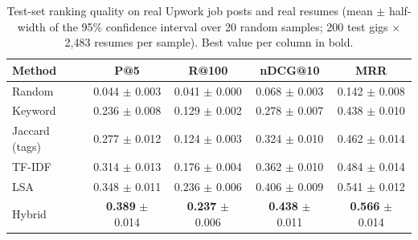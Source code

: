 \begin{table}[htbp]
\centering
\small
\caption{Test-set ranking quality on real Upwork job posts and real resumes (mean $\pm$ half-width of the 95\% confidence interval over 20 random samples; 200 test gigs $\times$ 2,483 resumes per sample). Best value per column in bold.}
\label{tab:main}
\begin{tabular}{lcccc}
\toprule
Method & P@5 & R@100 & nDCG@10 & MRR \\
\midrule
Random & 0.044 $\pm$ 0.003 & 0.041 $\pm$ 0.000 & 0.068 $\pm$ 0.003 & 0.142 $\pm$ 0.008 \\
Keyword & 0.236 $\pm$ 0.008 & 0.129 $\pm$ 0.002 & 0.278 $\pm$ 0.007 & 0.438 $\pm$ 0.010 \\
Jaccard (tags) & 0.277 $\pm$ 0.012 & 0.124 $\pm$ 0.003 & 0.324 $\pm$ 0.010 & 0.462 $\pm$ 0.014 \\
TF-IDF & 0.314 $\pm$ 0.013 & 0.176 $\pm$ 0.004 & 0.362 $\pm$ 0.010 & 0.484 $\pm$ 0.014 \\
LSA & 0.348 $\pm$ 0.011 & 0.236 $\pm$ 0.006 & 0.406 $\pm$ 0.009 & 0.541 $\pm$ 0.012 \\
Hybrid & \textbf{0.389} $\pm$ 0.014 & \textbf{0.237} $\pm$ 0.006 & \textbf{0.438} $\pm$ 0.011 & \textbf{0.566} $\pm$ 0.014 \\
\bottomrule
\end{tabular}
\end{table}
